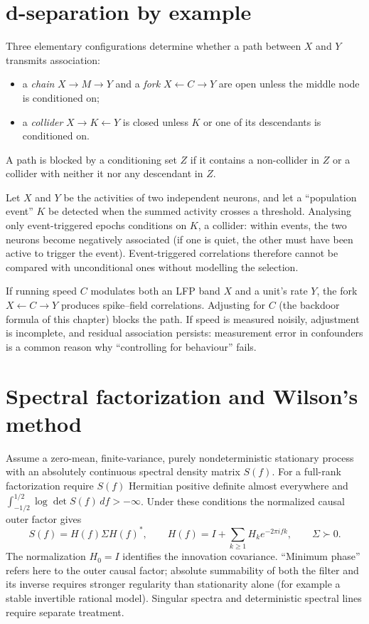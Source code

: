 \section{d-separation by example}
Three elementary configurations determine whether a path between $X$
and $Y$ transmits association:
\begin{itemize}[leftmargin=2em]
\item a \emph{chain} $X\to M\to Y$ and a \emph{fork} $X\leftarrow C\to Y$
are open unless the middle node is conditioned on;
\item a \emph{collider} $X\to K\leftarrow Y$ is closed unless $K$ or one of
its descendants is conditioned on.
\end{itemize}
A path is blocked by a conditioning set $Z$ if it contains a non-collider
in $Z$ or a collider with neither it nor any descendant in $Z$.
\begin{example}
Let $X$ and $Y$ be the activities of two independent neurons, and let a
``population event'' $K$ be detected when the summed activity crosses a
threshold. Analysing only event-triggered epochs conditions on $K$, a
collider: within events, the two neurons become negatively associated
(if one is quiet, the other must have been active to trigger the event).
Event-triggered correlations therefore cannot be compared with
unconditional ones without modelling the selection.
\end{example}
\begin{example}
If running speed $C$ modulates both an LFP band $X$ and a unit's rate $Y$,
the fork $X\leftarrow C\to Y$ produces spike--field correlations.
Adjusting for $C$ (the backdoor formula of this chapter) blocks the
path. If speed is measured noisily, adjustment is incomplete, and
residual association persists: measurement error in confounders is a
common reason why ``controlling for behaviour'' fails.
\end{example}

\section{Spectral factorization and Wilson's method}
Assume a zero-mean, finite-variance, purely nondeterministic stationary
process with an absolutely continuous spectral density matrix $S(f)$.
For a full-rank factorization require $S(f)$ Hermitian positive definite
almost everywhere and $\int_{-1/2}^{1/2}\log\det S(f)\,df>-\infty$.
Under these conditions the normalized causal outer factor gives
\[
S(f)=H(f)\Sigma H(f)^\ast,\qquad
H(f)=I+\sum_{k\ge1}H_ke^{-2\pi ifk},\qquad \Sigma\succ0.
\]
The normalization $H_0=I$ identifies the innovation covariance.
``Minimum phase'' refers here to the outer causal factor; absolute
summability of both the filter and its inverse requires stronger regularity
than stationarity alone (for example a stable invertible rational model).
Singular spectra and deterministic spectral lines require separate treatment.

